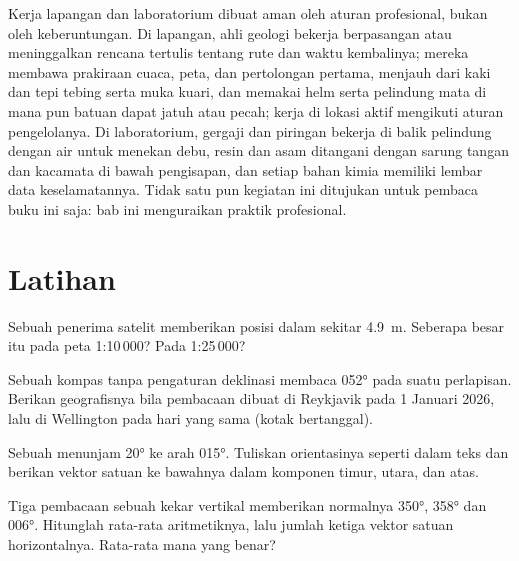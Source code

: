 \begin{safety}
Kerja lapangan dan laboratorium dibuat aman oleh aturan profesional, bukan oleh keberuntungan. Di lapangan, ahli geologi bekerja berpasangan atau meninggalkan rencana tertulis tentang rute dan waktu kembalinya; mereka membawa prakiraan cuaca, peta, dan pertolongan pertama, menjauh dari kaki dan tepi tebing serta muka kuari, dan memakai helm serta pelindung mata di mana pun batuan dapat jatuh atau pecah; kerja di lokasi aktif mengikuti aturan pengelolanya. Di laboratorium, gergaji dan piringan bekerja di balik pelindung dengan air untuk menekan debu, resin dan asam ditangani dengan sarung tangan dan kacamata di bawah pengisapan, dan setiap bahan kimia memiliki lembar data keselamatannya. Tidak satu pun kegiatan ini ditujukan untuk pembaca buku ini saja: bab ini menguraikan praktik profesional.
\end{safety}

\section{Latihan}

\begin{exercise}[$\star$]\label{exo:b1:field-lab-methods-1:1}
Sebuah penerima satelit memberikan posisi dalam sekitar \qty{4.9}{m}. Seberapa besar itu pada peta 1:10\,000? Pada 1:25\,000?
\end{exercise}

\begin{exercise}[$\star$]\label{exo:b1:field-lab-methods-1:2}
Sebuah kompas tanpa pengaturan deklinasi membaca  \ang{052} pada suatu perlapisan. Berikan  geografisnya bila pembacaan dibuat di Reykjavik pada 1 Januari 2026, lalu di Wellington pada hari yang sama (kotak bertanggal).
\end{exercise}

\begin{exercise}[$\star$]\label{exo:b1:field-lab-methods-1:3}
Sebuah  menunjam \ang{20} ke arah \ang{015}. Tuliskan orientasinya seperti dalam teks dan berikan vektor satuan ke bawahnya dalam komponen timur, utara, dan atas.
\end{exercise}

\begin{exercise}[$\star$]\label{exo:b1:field-lab-methods-1:4}
Tiga pembacaan sebuah kekar vertikal memberikan  normalnya \ang{350}, \ang{358} dan \ang{006}. Hitunglah rata-rata aritmetiknya, lalu  jumlah ketiga vektor satuan horizontalnya. Rata-rata mana yang benar?
\end{exercise}


